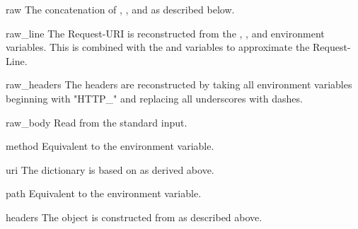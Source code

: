 \begin{datadesc}{raw}
The concatenation of , , and
 as described below.
\end{datadesc}

\begin{datadesc}{raw_line}
The Request-URI is reconstructed from the ,
, and  environment variables. This is
combined with the  and  variables
to approximate the Request-Line.
\end{datadesc}

\begin{datadesc}{raw_headers}
The headers are reconstructed by taking all environment variables beginning with
"HTTP_" and replacing all underscores with dashes.
\end{datadesc}

\begin{datadesc}{raw_body}
Read from the standard input.
\end{datadesc}

\begin{datadesc}{method}
Equivalent to the  environment variable.
\end{datadesc}

\begin{datadesc}{uri}
The dictionary is based on  as derived above.
\end{datadesc}

\begin{datadesc}{path}
Equivalent to the  environment variable.
\end{datadesc}

\begin{datadesc}{headers}
The  object is constructed from  as described
above.
\end{datadesc}


\begin{seealso}
\end{seealso}
